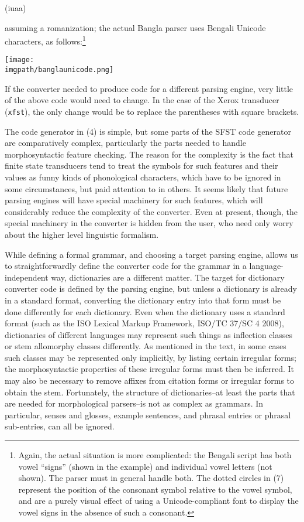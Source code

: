 \ea (i{\textbar}u{\textbar}aa)\z

assuming a romanization; the actual Bangla parser uses Bengali Unicode characters, as follows:\footnote{Again,
  the actual situation is more complicated: the Bengali script has both vowel ``signs'' (shown in the example) and individual vowel letters (not shown). The parser must in general handle both. The dotted circles in (7) represent the position of the consonant symbol relative to the vowel symbol, and are a purely visual effect of using a Unicode-compliant font to display the vowel signs in the absence of such a consonant. 
}
 

\ea \texttt{[image: \\imgpath/banglaunicode.png]} \z

If the converter needed to produce code for a different parsing engine, very little of the above code would need to change. In the case of the Xerox transducer (\texttt{xfst}), the only change would be to replace the parentheses with square brackets.

The code generator in (4) is simple, but some parts of the SFST code generator are comparatively complex, particularly the parts needed to handle morphosyntactic feature checking. The reason for the complexity is the fact that finite state transducers tend to treat the symbols for such features and their values as funny kinds of phonological characters, which have to be ignored in some circumstances, but paid attention to in others. It seems likely that future parsing engines will have special machinery for such features, which will considerably reduce the complexity of the converter. Even at present, though, the special machinery in the converter is hidden from the user, who need only worry about the higher level linguistic formalism.

While defining a formal grammar, and choosing a target parsing engine, allows us to straightforwardly define the converter code for the grammar in a language-independent way, dictionaries are a different matter. The target for dictionary converter code is defined by the parsing engine, but unless a dictionary is already in a standard format, converting the dictionary entry into that form must be done differently for each dictionary. Even when the dictionary uses a standard format (such as the ISO Lexical Markup Framework, ISO/TC 37/SC 4 2008), dictionaries of different languages may represent such things as inflection classes or stem allomorphy classes differently. As mentioned in the text, in some cases such classes may be represented only implicitly, by listing certain irregular forms; the morphosyntactic properties of these irregular forms must then be inferred. It may also be necessary to remove affixes from citation forms or irregular forms to obtain the stem. Fortunately, the structure of dictionaries--at least the parts that are needed for morphological parsers--is not as complex as grammars. In particular, senses and glosses, example sentences, and phrasal entries or phrasal sub-entries, can all be ignored.

\nocite{Knuth1999}
 
